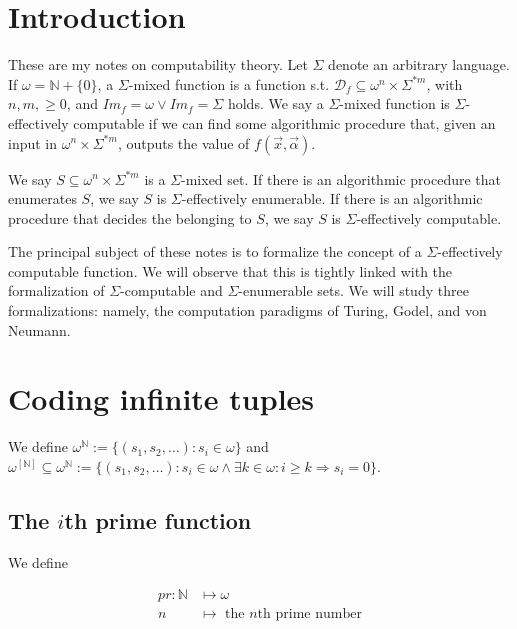 \documentclass[a4paper, 12pt]{article}
\begin{document}
\section{Introduction}

These are my notes on computability theory. 
Let $\Sigma$ denote an arbitrary
language. If $\omega = \mathbb{N} + \{ 0\}$, a $\Sigma$-mixed function is a
function s.t. $\mathcal{D}_f \subseteq \omega^n \times \Sigma^{*m}$, with $n, m,
\geq 0$, and $Im_f = \omega \lor Im_f = \Sigma$ holds. We say a $\Sigma$-mixed
function is $\Sigma$-effectively computable if we can find some algorithmic
procedure that, given an input in $\omega^n \times \Sigma^{*m}$, outputs the
value of $f(\overrightarrow{x}, \overrightarrow{\alpha})$. 

We say $S \subseteq \omega^n \times \Sigma^{*m}$ is a $\Sigma$-mixed set. If
there is an algorithmic procedure that enumerates $S$, we say $S$ is
$\Sigma$-effectively enumerable. If there is an algorithmic procedure that decides
the belonging to $S$, we say $S$ is $\Sigma$-effectively computable.


The principal subject of these notes is to formalize the concept of a
$\Sigma$-effectively computable function. We will observe that this is tightly
linked with the formalization of $\Sigma$-computable and $\Sigma$-enumerable
sets. We will study three formalizations: namely, the computation paradigms of
Turing, Godel, and von Neumann.

\pagebreak

\section{Coding infinite tuples}

We define $\omega^{\mathbb{N}} := \{ (s_1, s_2, \ldots) : s_i \in \omega \}$ and
$\omega^{\left[ \mathbb{N} \right] } \subseteq \omega^{\mathbb{N}} := \{(s_1,
s_2, \ldots) : s_i \in \omega \land \exists k \in \omega : i \geq k
\Rightarrow s_i = 0\}$. 

\subsection{The $i$th prime function}

We define 

\begin{align*}
    pr : \mathbb{N} &\mapsto \omega  \\ 
    n &\mapsto \text{ the $n$th prime number}
\end{align*}
\end{document}
